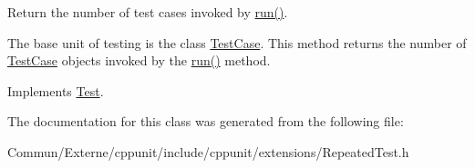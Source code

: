 Return the number of test cases invoked by \hyperlink{class_repeated_test_a6faffcd29b619305a75dd4c1995beaad}{run()}. 

The base unit of testing is the class \hyperlink{class_test_case}{Test\+Case}. This method returns the number of \hyperlink{class_test_case}{Test\+Case} objects invoked by the \hyperlink{class_repeated_test_a6faffcd29b619305a75dd4c1995beaad}{run()} method. 

Implements \hyperlink{class_test_a246dbb9bc986693c051b4f668e7706a6}{Test}.



The documentation for this class was generated from the following file\+:\begin{DoxyCompactItemize}
\item 
Commun/\+Externe/cppunit/include/cppunit/extensions/Repeated\+Test.\+h\end{DoxyCompactItemize}

